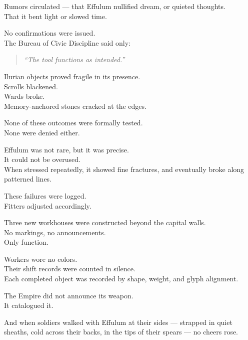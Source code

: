 \documentclass[12pt]{article}
\begin{document}
Rumors circulated — that Effulum nullified dream, or quieted thoughts.\\
That it bent light or slowed time.

No confirmations were issued.\\
The Bureau of Civic Discipline said only:

\begin{quote}
\textit{“The tool functions as intended.”}
\end{quote}

\vspace{1em}

Ilurian objects proved fragile in its presence.\\
Scrolls blackened.\\
Wards broke.\\
Memory-anchored stones cracked at the edges.

None of these outcomes were formally tested.\\
None were denied either.

\vspace{1em}

Effulum was not rare, but it was precise.\\
It could not be overused.\\
When stressed repeatedly, it showed fine fractures, and eventually broke along patterned lines.

These failures were logged.\\
Fitters adjusted accordingly.

\vspace{1em}

Three new workhouses were constructed beyond the capital walls.\\
No markings, no announcements.\\
Only function.

Workers wore no colors.\\
Their shift records were counted in silence.\\
Each completed object was recorded by shape, weight, and glyph alignment.

\vspace{1em}

The Empire did not announce its weapon.\\
It catalogued it.

And when soldiers walked with Effulum at their sides — strapped in quiet sheaths, cold across their backs, in the tips of their spears — no cheers rose.
\end{document}
